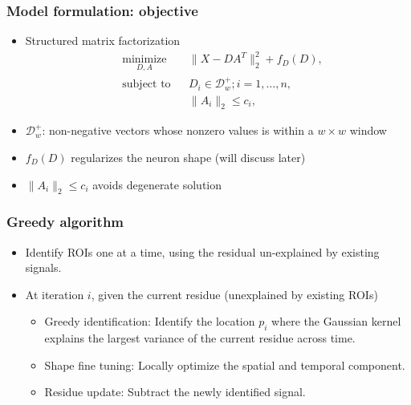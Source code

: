 \documentclass[16pt,presentation]{beamer}
\begin{document}
\begin{frame}
\frametitle{Model formulation: objective}
\begin{itemize}
\item Structured matrix factorization
\[
\begin{aligned}
& \underset{D, A}{\text{minimize}}
& & \| X - D A^T \|_2^2 + f_D(D), \\
& \text{subject to}
& & D_i \in \mathcal{D}_{w}^+; i = 1, \ldots, n,\\
& 
& & \|A_i\|_2 \leq c_i,
\end{aligned}
\]
\item $\mathcal{D}_{w}^+$: non-negative vectors whose nonzero values is within a $w \times w$ window
\item $f_D(D)$ regularizes the neuron shape (will discuss later)
\item $\|A_i\|_2 \leq c_i$ avoids degenerate solution
\end{itemize}
\end{frame}


\begin{frame}
\frametitle{Greedy algorithm}
\begin{itemize}
\item Identify ROIs one at a time, using the residual un-explained by existing signals.
\item At iteration $i$, given the current residue (unexplained by existing ROIs)
\begin{itemize}
\item \alert{Greedy identification}: Identify the location $p_i$ where the Gaussian kernel explains the largest variance of the current residue across time.
\item \alert{Shape fine tuning}: Locally optimize the spatial and temporal component.
\item \alert{Residue update}: Subtract the newly identified signal.
\end{itemize}
\end{itemize}
\end{frame}
\end{document}
